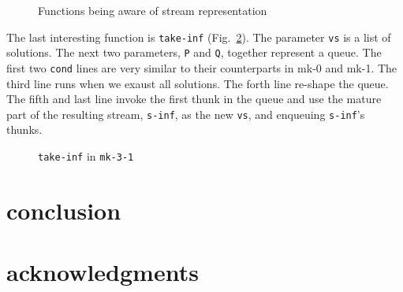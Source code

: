 \documentclass[format=acmlarge, review=true, authordraft=true]{acmart}
\begin{document}
\begin{figure}
	 	
	 \caption{Functions being aware of stream representation}
	 \label{interface}
\end{figure}

The last interesting function is \texttt{take-inf} (Fig.~\ref{take-inf-3-1}). 
The parameter \texttt{vs} is a list of solutions. The next two parameters, 
\texttt{P} and \texttt{Q}, together represent a queue. The first two 
\texttt{cond} lines are very similar to their counterparts in mk-0 and mk-1. 
The third line runs when we exaust all solutions. The forth line re-shape the 
queue. The fifth and last line invoke the first thunk in the queue and use the 
mature part of the resulting stream, \texttt{s-inf}, as the new \texttt{vs}, 
and enqueuing \texttt{s-inf}'s thunks. 

\begin{figure}
	 	
	 \caption{\texttt{take-inf} in \texttt{mk-3-1}}
	 \label{take-inf-3-1}
\end{figure}



\section{conclusion}

\section*{acknowledgments}



\end{document}
